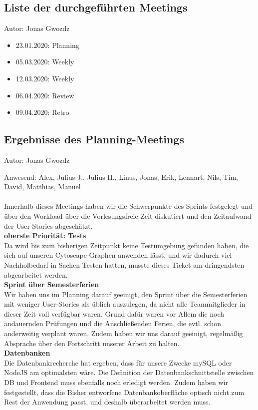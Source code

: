 \subsection{Liste der durchgeführten Meetings}
{\small Autor: Jonas Gwozdz}

\begin{itemize}
\item 23.01.2020: Planning
\item 05.03.2020: Weekly
\item 12.03.2020: Weekly
\item 06.04.2020: Review
\item 09.04.2020: Retro
\end{itemize}

\subsection{Ergebnisse des Planning-Meetings}
{\small Autor: Jonas Gwozdz}

Anwesend: Alex, Julius J., Julius H., Linus, Jonas, Erik, Lennart, Nils, Tim, David, Matthias, Manuel\\
\\
Innerhalb dieses Meetings haben wir die Schwerpunkte des Sprints festgelegt und über den Workload über die Vorlesungsfreie Zeit diskutiert und den Zeitaufwand der User-Stories abgeschätzt.\\


\textbf{oberste Priorität: Tests}\\
Da wird bis zum bisherigen Zeitpunkt keine Testumgebung gefunden haben, die sich auf unseren Cytoscape-Graphen anwenden lässt, und wir dadurch viel Nachholbedarf in Sachen Testen hatten, musste dieses Ticket am dringendsten abgearbeitet werden.\\

\textbf{Sprint über Semesterferien}\\
Wir haben uns im Planning darauf geeinigt, den Sprint über die Semesterferien mit weniger User-Stories als üblich auszulegen, da nicht alle Teammitglieder in dieser Zeit voll verfügbar waren, Grund dafür waren vor Allem die noch andauernden Prüfungen und die Anschließenden Ferien, die evtl. schon anderweitig verplant waren. Zudem haben wir uns darauf geeinigt, regelmäßig Absprache über den Fortschritt unserer Arbeit zu halten.\\

\textbf{Datenbanken}\\
Die Datenbankrecherche hat ergeben, dass für unsere Zwecke mySQL oder NodeJS am optimalsten wäre. Die Definition der Datenbankschnittstelle zwischen DB und Frontend muss ebenfalls noch erledigt werden. Zudem haben wir festgestellt, dass die Bisher entworfene Datenbankoberfläche optisch nicht zum Rest der Anwendung passt, und deshalb überarbeitet werden muss.\\

